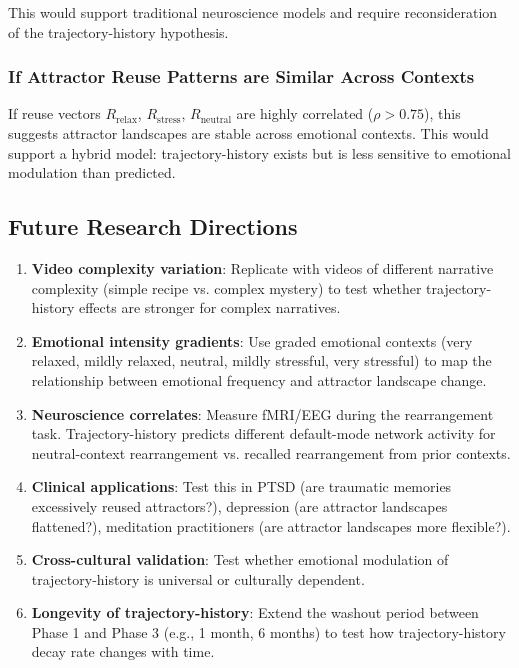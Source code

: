 \documentclass[12pt,a4paper]{article}
\theoremstyle{definition}
\begin{document}
This would support traditional neuroscience models and require reconsideration of the trajectory-history hypothesis.

\subsubsection{If Attractor Reuse Patterns are Similar Across Contexts}

If reuse vectors $R_{\text{relax}}$, $R_{\text{stress}}$, $R_{\text{neutral}}$ are highly correlated ($\rho > 0.75$), this suggests attractor landscapes are stable across emotional contexts. This would support a hybrid model: trajectory-history exists but is less sensitive to emotional modulation than predicted.

\subsection{Future Research Directions}

\begin{enumerate}
  \item \textbf{Video complexity variation}: Replicate with videos of different narrative complexity (simple recipe vs. complex mystery) to test whether trajectory-history effects are stronger for complex narratives.

  \item \textbf{Emotional intensity gradients}: Use graded emotional contexts (very relaxed, mildly relaxed, neutral, mildly stressful, very stressful) to map the relationship between emotional frequency and attractor landscape change.

  \item \textbf{Neuroscience correlates}: Measure fMRI/EEG during the rearrangement task. Trajectory-history predicts different default-mode network activity for neutral-context rearrangement vs. recalled rearrangement from prior contexts.

  \item \textbf{Clinical applications}: Test this in PTSD (are traumatic memories excessively reused attractors?), depression (are attractor landscapes flattened?), meditation practitioners (are attractor landscapes more flexible?).

  \item \textbf{Cross-cultural validation}: Test whether emotional modulation of trajectory-history is universal or culturally dependent.

  \item \textbf{Longevity of trajectory-history}: Extend the washout period between Phase 1 and Phase 3 (e.g., 1 month, 6 months) to test how trajectory-history decay rate changes with time.
\end{enumerate}
\end{document}
